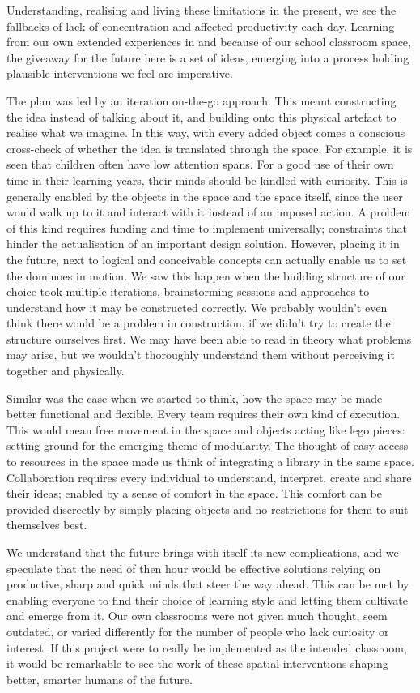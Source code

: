 \documentclass[a4paper,7pt]{article}
\begin{document}
Understanding, realising and living these limitations in the present, we see the fallbacks of lack of concentration and affected productivity each day. Learning from our own extended experiences in and because of our school classroom space, the giveaway for the future here is a set of ideas, emerging into a process holding plausible interventions we feel are imperative. 

The plan was led by an iteration on-the-go approach. This meant constructing the idea instead of talking about it, and building onto this physical artefact to realise what we imagine. In this way, with every added object comes a conscious cross-check of whether the idea is translated through the space. For example, it is seen that children often have low attention spans. For a good use of their own time in their learning years, their minds should be kindled with curiosity. This is generally enabled by the objects in the space and the space itself, since the user would walk up to it and interact with it instead of an imposed action. A problem of this kind requires funding and time to implement universally; constraints that hinder the actualisation of an important design solution. However, placing it in the future, next to logical and conceivable concepts can actually enable us to set the dominoes in motion. We saw this happen when the building structure of our choice took multiple iterations, brainstorming sessions and approaches to understand how it may be constructed correctly. We probably wouldn’t even think there would be a problem in construction, if we didn’t try to create the structure ourselves first. We may have been able to read in theory what problems may arise, but we wouldn’t thoroughly understand them without perceiving it together and physically.

Similar was the case when we started to think, how the space may be made better functional and flexible. Every team requires their own kind of execution. This would mean free movement in the space and objects acting like lego pieces: setting ground for the emerging theme of modularity. The thought of easy access to resources in the space made us think of integrating a library in the same space. Collaboration requires every individual to understand, interpret, create and share their ideas; enabled by a sense of comfort in the space. This comfort can be provided discreetly by simply placing objects and no restrictions for them to suit themselves best. 

We understand that the future brings with itself its new complications, and we speculate that the need of then hour would be effective solutions relying on productive, sharp and quick minds that steer the way ahead. This can be met by enabling everyone to find their choice of learning style and letting them cultivate and emerge from it. Our own classrooms were not given much thought, seem outdated, or varied differently for the number of people who lack curiosity or interest. If this project were to really be implemented as the intended classroom, it would be remarkable to see the work of these spatial interventions shaping better, smarter humans of the future.
\end{document}

